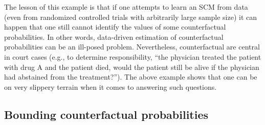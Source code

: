 The lesson of this example is that if one attempts to learn an SCM from data (even from randomized controlled trials with arbitrarily large sample size) it can happen that one still cannot identify the values of some counterfactual probabilities. 
In other words, data-driven estimation of counterfactual probabilities can be an ill-posed problem. 
Nevertheless, counterfactual are central in court cases (e.g., to determine responsibility, ``the physician treated the patient with drug A and the patient died, would the patient still be alive if the physician had abstained from the treatment?''). 
The above example shows that one can be on very slippery terrain when it comes to answering such questions. 

\subsection{Bounding counterfactual probabilities}

